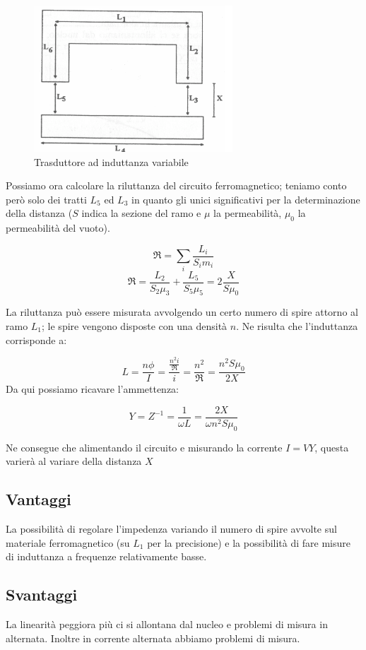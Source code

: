 \begin{figure}[htbp]
	\centering
	\includegraphics[scale=0.5]
			{img/induttanza-variabile.png}
	\caption{Trasduttore ad induttanza
variabile\label{fig:trasdifffase}}
\end{figure}

Possiamo ora calcolare la riluttanza del circuito ferromagnetico;
teniamo conto però solo dei tratti $L_5$ ed $L_3$ in quanto gli unici
significativi per la determinazione della distanza ($S$ indica la
sezione del ramo e $\mu$ la permeabilità, $\mu_0$ la permeabilità
del vuoto).

	\[\Re=\sum_i{\frac{L_i}{S_im_i}}\]
	\[\Re=\frac{L_2}{S_2\mu_3} + \frac{L_5}{S_5\mu_5}
	     =2\frac{X}{S\mu_0}\]

La riluttanza può essere misurata avvolgendo un certo numero di spire
attorno al ramo $L_1$; le spire vengono disposte con una densità $n$.
Ne risulta che l'induttanza corrisponde a:

	\[
	L=\frac{n\phi}{I}
	 =\frac{\frac{n^2i}{\Re}}{i}
	 =\frac{n^2}{\Re}
	 =\frac{n^2S\mu_0}{2X}
	\]
Da qui possiamo ricavare l'ammettenza:

	\[Y=Z^{-1}=\frac{1}{\omega L}=\frac{2X}{\omega n^2S\mu_0}\]

Ne consegue che alimentando il circuito e misurando la
corrente $I=VY$, questa varierà al variare della distanza $X$

\subsection{Vantaggi}
La possibilità di regolare l'impedenza variando il numero di
spire avvolte sul materiale ferromagnetico (su $L_1$ per la
precisione) e la possibilità di fare misure di induttanza a frequenze
relativamente basse.
\subsection{Svantaggi}
La linearità peggiora più ci si allontana dal nucleo e
problemi di misura in alternata. Inoltre in corrente alternata abbiamo
problemi di misura.

